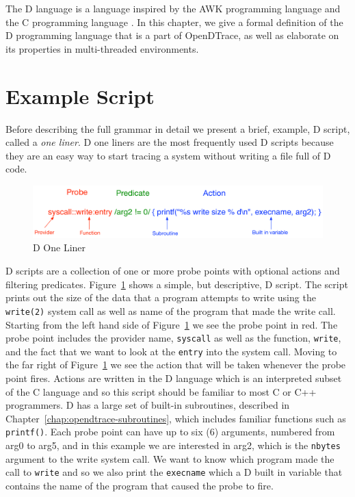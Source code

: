 The D language is a language inspired by the AWK programming language
\cite{Aho:1987:APL:29361} and the C programming language
\cite{DTrace2004}\cite{Kernighan:1988}. In this chapter, we give a
formal definition of the D programming language that is a part of
OpenDTrace, as well as elaborate on its properties in multi-threaded
environments.

\section{Example Script}
\label{sec:example-script}

Before describing the full grammar in detail we present a brief,
example, D script, called a \emph{one liner}.  D one liners are the
most frequently used D scripts because they are an easy way to start
tracing a system without writing a file full of D code.


\begin{figure}
  \centering
  \includegraphics[width=0.8\linewidth]{oneliner.pdf}
  \caption{D One Liner}
  \label{fig:d-one-liner}
\end{figure}

D scripts are a collection of one or more probe points with optional
actions and filtering predicates.  Figure~\ref{fig:d-one-liner} shows
a simple, but descriptive, D script.  The script prints out the size
of the data that a program attempts to write using the
\texttt{write(2)} system call as well as name of the program that made
the write call.  Starting from the left hand side of
Figure~\ref{fig:d-one-liner} we see the probe point in red.  The probe
point includes the provider name, \texttt{syscall} as well as the
function, \texttt{write}, and the fact that we want to look at the
\texttt{entry} into the system call.  Moving to the far right of
Figure~\ref{fig:d-one-liner} we see the action that will be taken
whenever the probe point fires.  Actions are written in the D language
which is an interpreted subset of the C language and so this script
should be familiar to most C or C++ programmers.  D has a large set of
built-in subroutines, described in Chapter~\ref{chap:opendtrace-subroutines},
which includes familiar functions such as \texttt{printf()}.  Each
probe point can have up to six (6) arguments, numbered from arg0 to
arg5, and in this example we are interested in arg2, which is the
\texttt{nbytes} argument to the write system call.  We want to know
which program made the call to \texttt{write} and so we also print the
\texttt{execname} which a D built in variable that contains the name
of the program that caused the probe to fire.

